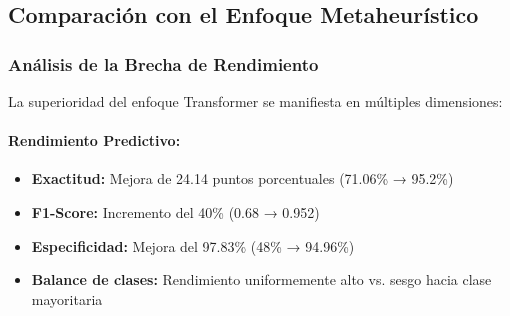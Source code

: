 \subsection{Comparación con el Enfoque Metaheurístico}
\label{subsec:comparacion_enfoques}

\begin{table}[htbp]
\centering
{}
\caption{Comparación exhaustiva entre el mejor algoritmo metaheurístico (GA) y el modelo DistilBERT optimizado.}
\label{tab:comparacion_exhaustiva}
\end{table}

\subsubsection{Análisis de la Brecha de Rendimiento}

La superioridad del enfoque Transformer se manifiesta en múltiples dimensiones:

\paragraph{Rendimiento Predictivo:}
\begin{itemize}
    \item \textbf{Exactitud:} Mejora de 24.14 puntos porcentuales (71.06\% → 95.2\%)
    \item \textbf{F1-Score:} Incremento del 40\% (0.68 → 0.952)
    \item \textbf{Especificidad:} Mejora del 97.83\% (48\% → 94.96\%)
    \item \textbf{Balance de clases:} Rendimiento uniformemente alto vs. sesgo hacia clase mayoritaria
\end{itemize}

